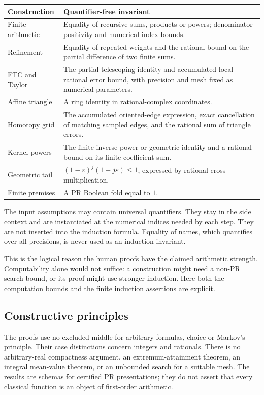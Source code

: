 \documentclass[11pt]{article}
\theoremstyle{definition}
\begin{document}
\begin{longtable}{>{\raggedright\arraybackslash}p{}
                  >{\raggedright\arraybackslash}p{}}
\toprule
Construction & Quantifier-free invariant\\\midrule
\endhead
Finite arithmetic &
Equality of recursive sums, products or powers; denominator positivity
and numerical index bounds.\\
Refinement &
Equality of repeated weights and the rational bound on the partial
difference of two finite sums.\\
FTC and Taylor &
The partial telescoping identity and accumulated local rational error
bound, with precision and mesh fixed as numerical parameters.\\
Affine triangle &
A ring identity in rational-complex coordinates.\\
Homotopy grid &
The accumulated oriented-edge expression, exact cancellation of matching
sampled edges, and the rational sum of triangle errors.\\
Kernel powers &
The finite inverse-power or geometric identity and a rational bound on its
finite coefficient sum.\\
Geometric tail &
\((1-\varepsilon)^j(1+j\varepsilon)\le1\), expressed by rational
cross multiplication.\\
Finite premises &
A PR Boolean fold equal to \(1\).\\\bottomrule
\end{longtable}

The input assumptions may contain universal quantifiers. They stay in the
side context and are instantiated at the numerical indices needed by each
step. They are not inserted into the induction formula.
Equality of names, which quantifies over all precisions, is never used as
an induction invariant.

This is the logical reason the human proofs have the claimed arithmetic
strength. Computability alone would not suffice: a construction might
need a non-PR search bound, or its proof might use stronger induction.
Here both the computation bounds and the finite induction assertions
are explicit.

\subsection{Constructive principles}

The proofs use no excluded middle for arbitrary formulas, choice or
Markov's principle. Their case distinctions concern integers and
rationals. There is no arbitrary-real compactness argument, an
extremum-attainment theorem, an integral mean-value theorem, or an
unbounded search for a suitable mesh.
The results are schemas for certified PR presentations; they do not assert
that every classical function is an object of first-order arithmetic.
\end{document}
